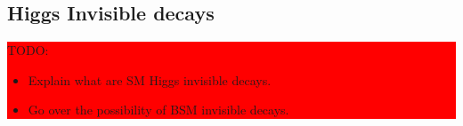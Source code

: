 \subsection{Higgs Invisible decays}

\colorbox{red}{
\begin{minipage}{0.95\linewidth}
TODO: 
\begin{itemize}
  \item Explain what are SM Higgs invisible decays.
  \item Go over the possibility of BSM invisible decays.
\end{itemize}

\end{minipage}
}

\cite{ARTICLE:Higgs_SpontaneousSymmetryBreakdown}
\cite{BOOK:Griffiths}


